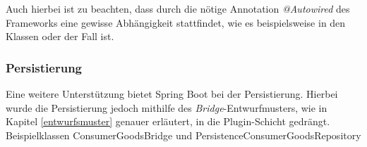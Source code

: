 Auch hierbei ist zu beachten, dass durch die nötige Annotation \textit{@Autowired} des Frameworks eine gewisse Abhängigkeit stattfindet, wie es beispielsweise in den Klassen \href{https://github.com/lucasmerkel/dhbw-advancedswe-programmentwurf/blob/d5c89113d12c3b877ddc4d6a99225b277ddd468f/swe_programmentwurf/consumergoods-inventory-planner/2-cip-application/src/main/java/de/dhbw/cip/application/ConsumerGoodsManager.java#L17}{} oder \href{https://github.com/lucasmerkel/dhbw-advancedswe-programmentwurf/blob/d5c89113d12c3b877ddc4d6a99225b277ddd468f/swe_programmentwurf/consumergoods-inventory-planner/0-cip-plugins/src/main/java/de/dhbw/cip/plugins/rest/ConsumerGoodsGuiController.java#L46}{} der Fall ist.

\subsubsection*{Persistierung}
Eine weitere Unterstützung bietet Spring Boot bei der Persistierung.
Hierbei wurde die Persistierung jedoch mithilfe des \textit{Bridge}-Entwurfmusters, wie in Kapitel \ref{entwurfsmuster} genauer erläutert, in die Plugin-Schicht gedrängt.
Beispielklassen ConsumerGoodsBridge und PersistenceConsumerGoodsRepository

